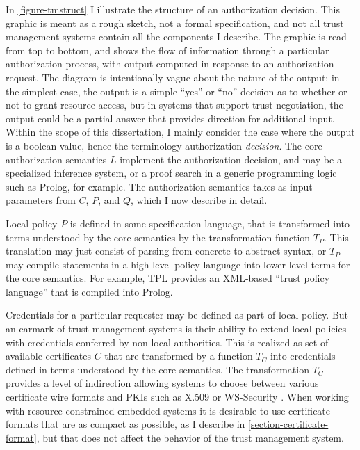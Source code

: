 In \autoref{figure-tmstruct} I illustrate the structure of an authorization decision. This
graphic is meant as a rough sketch, not a formal specification, and not all trust management
systems contain all the components I describe. The graphic is read from top to bottom, and shows
the flow of information through a particular authorization process, with output computed in
response to an authorization request. The diagram is intentionally vague about the nature of the
output: in the simplest case, the output is a simple ``yes'' or ``no'' decision as to whether or
not to grant resource access, but in systems that support trust negotiation, the output could be
a partial answer that provides direction for additional input. Within the scope of this
dissertation, I mainly consider the case where the output is a boolean value, hence the
terminology authorization \emph{decision}. The core authorization semantics $L$ implement the
authorization decision, and may be a specialized inference system, or a proof search in a
generic programming logic such as Prolog, for example. The authorization semantics takes as
input parameters from $C$, $P$, and $Q$, which I now describe in detail.

\tmstructfig

Local policy $P$ is defined in some specification language, that is transformed into terms
understood by the core semantics by the transformation function $T_P$. This translation may just
consist of parsing from concrete to abstract syntax, or $T_P$ may compile statements in a
high-level policy language into lower level terms for the core semantics. For example, TPL
\cite{Herzberg:ACMPKI} provides an XML-based ``trust policy language'' that is compiled into
Prolog.

Credentials for a particular requester may be defined as part of local policy. But an earmark of
trust management systems is their ability to extend local policies with credentials conferred by
non-local authorities. This is realized as set of available certificates $C$ that are
transformed by a function $T_C$ into credentials defined in terms understood by the core
semantics. The transformation $T_C$ provides a level of indirection allowing systems to choose
between various certificate wire formats and PKIs such as X.509 \cite{X509} or WS-Security
\cite{OASIS:WSSTC}. When working with resource constrained embedded systems it is desirable to
use certificate formats that are as compact as possible, as I describe in
\autoref{section-certificate-format}, but that does not affect the behavior of the trust
management system.


